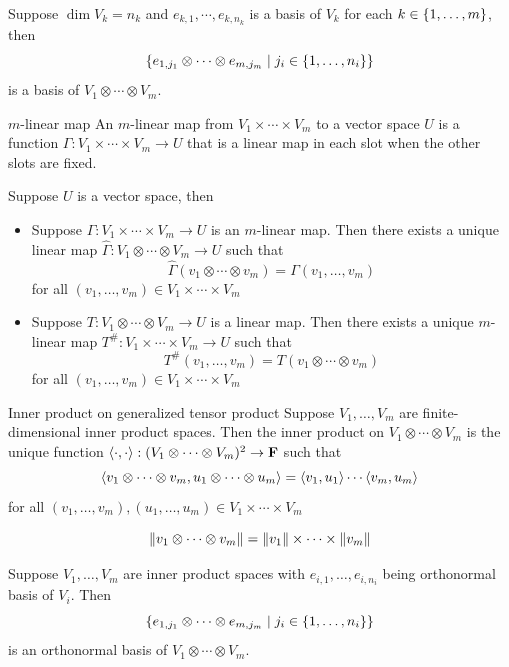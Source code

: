 \documentclass[12pt,a4paper]{article}
\begin{document}
    \begin{prop}
        Suppose $\dim V_k=n_k$ and $e_{k,1},\cdots,e_{k,n_k}$ is a basis of $V_k$ for each $k\in\left\{1,\dots,m\right\}$, then
        $$
        \left\{e_{1,j_1}\otimes\cdots\otimes e_{m,j_m}\mid j_{i}\in\left\{1,\dots,n_i\right\}\right\}
        $$
        is a basis of $V_1\otimes\cdots\otimes V_m$.
    \end{prop}
    \hfill

    \begin{defi}{$m$-linear map}
        An $m$-linear map from $V_1\times\cdots\times V_m$ to a vector space $U$ is a function $\Gamma:V_1\times\cdots\times V_m\to U$ that is a linear map in each slot when the other slots are fixed.
    \end{defi}
    \begin{prop}
        Suppose $U$ is a vector space, then
        \begin{itemize}
            \item Suppose $\Gamma:V_1\times\cdots\times V_m\to U$ is an $m$-linear map. Then there exists a unique linear map $\hat{\Gamma}:V_1\otimes\cdots\otimes V_m\to U$ such that
            $$
            \hat{\Gamma}(v_1\otimes\cdots\otimes v_m)=\Gamma(v_1,\dots,v_m)
            $$
            for all $(v_1,\dots,v_m)\in V_1\times\cdots\times V_m$
            \item Suppose $T:V_1\otimes\cdots\otimes V_m\to U$ is a linear map. Then there exists a unique $m$-linear map $T^\#:V_1\times\cdots\times V_m\to U$ such that
            $$
            T^\#(v_1,\dots,v_m)=T(v_1\otimes\cdots\otimes v_m)
            $$
            for all $(v_1,\dots,v_m)\in V_1\times\cdots\times V_m$
        \end{itemize}
    \end{prop}
    \hfill

    \begin{defi}{Inner product on generalized tensor product}
        Suppose $V_1,\dots,V_m$ are finite-dimensional inner product spaces. Then the inner product on $V_1\otimes\cdots\otimes V_m$ is the unique function $\langle\cdot,\cdot\rangle:(V_1\otimes\cdots\otimes V_m)^2\to\mathbf{F}$ such that
        $$
        \langle v_1\otimes\cdots\otimes v_m,u_1\otimes\cdots\otimes u_m\rangle=\langle v_1,u_1\rangle\cdots\langle v_m,u_m\rangle
        $$
        for all $(v_1,\dots,v_m),(u_1,\dots,u_m)\in V_1\times\cdots\times V_m$
    \end{defi}
    \begin{cor}
        $$
        \left\lVert v_1\otimes\cdots\otimes v_m\right\rVert=\left\lVert v_1\right\rVert\times\cdots\times\left\lVert v_m\right\rVert
        $$
    \end{cor}
    \hfill

    \begin{prop}
        Suppose $V_1,\dots,V_m$ are inner product spaces with $e_{i,1},\dots,e_{i,n_{i}}$ being orthonormal basis of $V_i$. Then
        $$
        \left\{e_{1,j_1}\otimes\cdots\otimes e_{m,j_m}\mid j_i\in\left\{1,\dots,n_i\right\}\right\}
        $$
        is an orthonormal basis of $V_1\otimes\cdots\otimes V_m$.
    \end{prop}


    
    \printglossary
\end{document}
